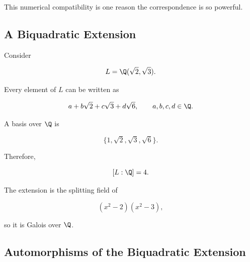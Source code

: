 \begin{center}
\end{center}

This numerical compatibility is one reason the correspondence is so powerful.

\subsection{A Biquadratic Extension}
\label{subsec:biquadratic-extension}

Consider

\[ L=\Q(\sqrt2,\sqrt3). \]

Every element of \(L\) can be written as

\[ a+b\sqrt2+c\sqrt3+d\sqrt6, \qquad a,b,c,d\in\Q. \]

A basis over \(\Q\) is

\[ \{1,\sqrt2,\sqrt3,\sqrt6\}. \]

Therefore,

\[ [L:\Q]=4. \]

The extension is the splitting field of

\[ (x^2-2)(x^2-3), \]

so it is Galois over \(\Q\).

\subsection{Automorphisms of the Biquadratic Extension}
\label{subsec:biquadratic-automorphisms}

